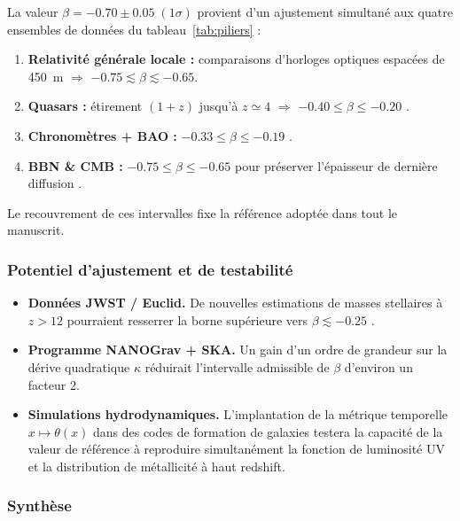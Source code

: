 \documentclass[11pt]{article}
\begin{document}
La valeur \(\beta=-0.70\pm0.05\;(1\sigma)\) provient d’un ajustement
simultané aux quatre ensembles de données du
tableau~\ref{tab:piliers} :

\begin{enumerate}[label=\alph*)]
  \item \textbf{Relativité générale locale :} comparaisons d’horloges optiques espacées de \SI{450}{\metre} \parencite{Delva2019,Grotti2018} \(\Rightarrow\) \(-0.75\lesssim\beta\lesssim-0.65\).
\item \textbf{Quasars :} étirement \((1+z)\) jusqu’à \(z\simeq4\) 
      \(\Rightarrow\) \(-0.40\le\beta\le-0.20\) \parencite{Zheng2023}.
\item \textbf{Chronomètres + BAO :} \(-0.33\le\beta\le-0.19\) 
      \parencite{Moresco2022}.
\item \textbf{BBN \& CMB :} \(-0.75\le\beta\le-0.65\) pour préserver l’épaisseur de dernière diffusion \parencite{Planck2020}.
\end{enumerate}

Le recouvrement de ces intervalles fixe la référence adoptée
dans tout le manuscrit.

\subsubsection{Potentiel d’ajustement et de testabilité}

\begin{itemize}
  \item \textbf{Données JWST / Euclid.}  
        De nouvelles estimations de masses stellaires à \(z>12\)
        pourraient resserrer la borne supérieure vers
        \(\beta\lesssim-0.25\) \parencite{Labbe2024,Euclid2024}.
  \item \textbf{Programme NANOGrav + SKA.}  
        Un gain d’un ordre de grandeur sur la dérive quadratique
        \(\kappa\) réduirait l’intervalle admissible de \(\beta\)
        d’environ un facteur 2.
  \item \textbf{Simulations hydrodynamiques.}  
        L’implantation de la métrique temporelle
        \(x\mapsto\theta(x)\) dans des codes de formation de galaxies
        testera la capacité de la valeur de référence à reproduire
        simultanément la fonction de luminosité UV et la distribution
        de métallicité à haut redshift.
\end{itemize}

\subsubsection{Synthèse}
\end{document}
